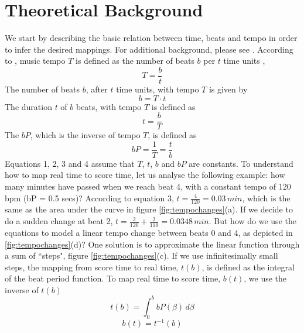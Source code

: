 \documentclass{sig-alternate}
\begin{document}
\section{Theoretical Background}
We start by describing the basic relation between time, beats and tempo in order to infer the desired mappings. For additional background, please see \cite{wheresthebeat,honing:time2time}. According to \cite{wheresthebeat}, music tempo $T$ is defined as the number of beats $b$ per $t$ time units \cite{maccallum:2010},
\begin{equation}
T = \frac{b}{t}
\end{equation}
The number of beats $b$, after $t$ time units, with tempo $T$ is given by
\begin{equation}
b = T \cdot t
\end{equation}
The duration $t$ of $b$ beats, with tempo $T$ is defined as 
\begin{equation}
t = \frac{b}{T}
\end{equation}
The $bP$, which is the inverse of tempo $T$, is defined as 
\begin{equation}
bP = \frac{1}{T} = \frac{t}{b}
\end{equation}
Equations 1, 2, 3 and 4  assume that $T$, $t$, $b$ and $bP$ are constants. To understand how to map real time to score time, let us analyse the following example: how many minutes have passed when we reach beat 4, with a constant tempo of 120 bpm (bP = 0.5 secs)? According to equation 3, $t = \frac{4}{120} = 0.03\,min$, which is the same as the area under the curve in figure \ref{fig:tempochanges}(a). If we decide to do a sudden change at beat 2, $t = \frac{2}{120} + \frac{2}{110} = 0.0348\,min$. But how do we use the equations to model a linear tempo change between beats 0 and 4, as depicted in \ref{fig:tempochanges}(d)? One solution is to approximate the linear function through a sum of ``steps", figure \ref{fig:tempochanges}(c). If we use infinitesimally small steps, the mapping from score time to real time, $t(b)$, is defined as the integral of the beat period function. To map real time to score time, $b(t)$, we use the inverse of $t(b)$
\begin{equation}
t(b) = \int_{0}^{b} bP(\beta)\,d\beta
\end{equation}
\begin{equation}
b(t) = t^{-1}(b)
\end{equation}
\end{document}
